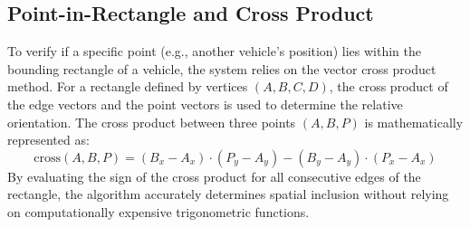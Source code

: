 \documentclass[../report_main.tex]{subfiles}
\begin{document}
\subsection{Point-in-Rectangle and Cross Product}
To verify if a specific point (e.g., another vehicle's position) lies within the bounding rectangle of a vehicle, the system relies on the vector cross product method. For a rectangle defined by vertices $(A, B, C, D)$, the cross product of the edge vectors and the point vectors is used to determine the relative orientation. The cross product between three points $(A, B, P)$ is mathematically represented as:
\begin{equation}
    \text{cross}(A, B, P) = (B_x - A_x) \cdot (P_y - A_y) - (B_y - A_y) \cdot (P_x - A_x)
\end{equation}
By evaluating the sign of the cross product for all consecutive edges of the rectangle, the algorithm accurately determines spatial inclusion without relying on computationally expensive trigonometric functions.
\end{document}
